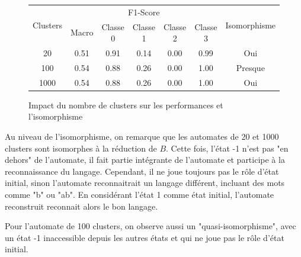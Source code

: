 \documentclass{article}
\begin{document}
\begin{figure}[ht]
    \centering
    \begin{tabular}{|c|c|c|c|c|c|c|}
        \hline
        \multirow{2}{*}{Clusters} & \multicolumn{5}{|c|}{F1-Score} & \multirow{2}{*}{Isomorphisme} \\
        \cline{2-6}
         & Macro & Classe 0 & Classe 1 & Classe 2 & Classe 3 & \\
        \hline
        20 & 0.51 & 0.91 & 0.14 & 0.00 & 0.99 & Oui \\
        \hline
        100 & 0.54 & 0.88 & 0.26 & 0.00 & 1.00 & Presque \\
        \hline
        1000 & 0.54 & 0.88 & 0.26 & 0.00 & 1.00 & Oui \\
        \hline
    \end{tabular}
    \caption{Impact du nombre de clusters sur les performances et l'isomorphisme}
    \label{tab:clusters-chevauchement}
\end{figure}

Au niveau de l'isomorphisme, on remarque que les automates de 20 et 1000 clusters sont isomorphes à la réduction de $B$.
Cette fois, l'état -1 n'est pas "en dehors" de l'automate, il fait partie intégrante de l'automate et participe à la 
reconnaissance du langage. Cependant, il ne joue toujours pas le rôle d'état initial, sinon l'automate 
reconnaitrait un langage différent, incluant des mots comme "b" ou "ab". En considérant l'état 1 comme état initial, 
l'automate reconstruit reconnait alors le bon langage.
\par Pour l'automate de 100 clusters, on observe aussi un "quasi-isomorphisme", avec un état -1 inaccessible depuis les autres états
et qui ne joue pas le rôle d'état initial.
\end{document}
